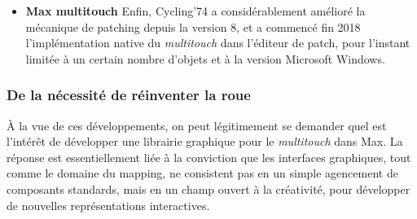 \begin{itemize}[noitemsep]
	\item \textbf{Max multitouch} Enfin, Cycling'74 a considérablement amélioré la mécanique de patching depuis la version 8, et a commencé fin 2018 l'implémentation native du \textit{multitouch} dans l'éditeur de patch, pour l'instant limitée à un certain nombre d'objets et à la version Microsoft Windows.
\end{itemize}

\subsubsection{De la nécessité de réinventer la roue} 

\noindent À la vue de ces développements, on peut légitimement se demander quel est l'intérêt de développer une librairie graphique pour le \textit{multitouch} dans Max. La réponse est essentiellement liée à la conviction que les interfaces graphiques, tout comme le domaine du mapping, ne consistent pas en un simple agencement de composants standards, mais en un champ ouvert à la créativité, pour développer de nouvelles représentations interactives. \\
